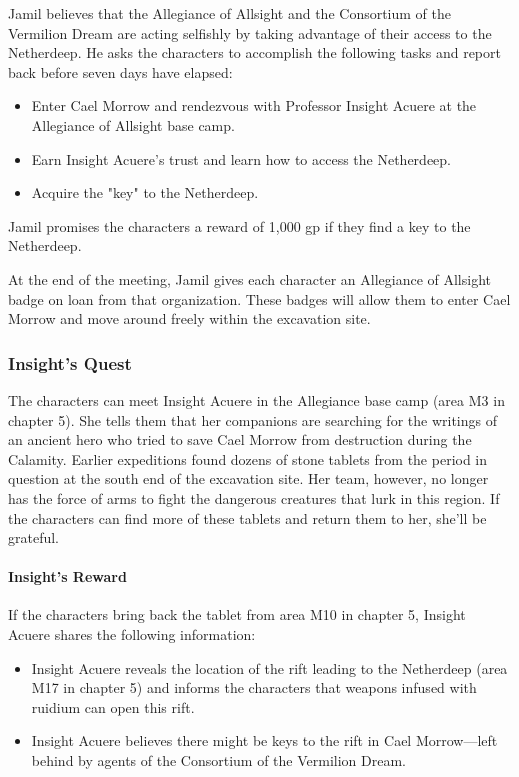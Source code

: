 \documentclass[10pt,a4paper,twoside,bg=print,twocolumn,openany,nodeprecatedcode]{dndbook}
\begin{document}
Jamil believes that the Allegiance of Allsight and the Consortium of the Vermilion Dream are acting selfishly by taking advantage of their access to the Netherdeep. He asks the characters to accomplish the following tasks and report back before seven days have elapsed:


\begin{itemize}
\item Enter Cael Morrow and rendezvous with Professor Insight Acuere at the Allegiance of Allsight base camp.
\item Earn Insight Acuere's trust and learn how to access the Netherdeep.
\item Acquire the "key" to the Netherdeep.
\end{itemize}

Jamil promises the characters a reward of 1,000 gp if they find a key to the Netherdeep.

At the end of the meeting, Jamil gives each character an Allegiance of Allsight badge on loan from that organization. These badges will allow them to enter Cael Morrow and move around freely within the excavation site.

\subsubsection{Insight's Quest}
The characters can meet Insight Acuere in the Allegiance base camp (area M3 in chapter 5). She tells them that her companions are searching for the writings of an ancient hero who tried to save Cael Morrow from destruction during the Calamity. Earlier expeditions found dozens of stone tablets from the period in question at the south end of the excavation site. Her team, however, no longer has the force of arms to fight the dangerous creatures that lurk in this region. If the characters can find more of these tablets and return them to her, she'll be grateful.

\paragraph{Insight's Reward}
If the characters bring back the tablet from area M10 in chapter 5, Insight Acuere shares the following information:


\begin{itemize}
\item Insight Acuere reveals the location of the rift leading to the Netherdeep (area M17 in chapter 5) and informs the characters that weapons infused with ruidium can open this rift.
\item Insight Acuere believes there might be keys to the rift in Cael Morrow—left behind by agents of the Consortium of the Vermilion Dream.
\end{itemize}
\end{document}
